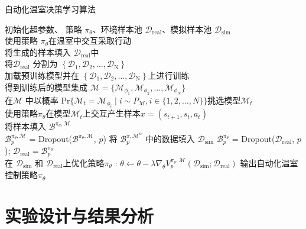 \begin{algorithm}[ht]
\caption{自动化温室决策学习算法}
\begin{algorithmic}
\STATE 初始化超参数、 策略 $\pi_\theta$、环境样本池 $\mathcal{D}_{\mathrm{real}}$、模拟样本池 $\mathcal{D}_{\mathrm{sim}}$\\
    \STATE 使用策略 $\pi_\theta$在温室中交互采取行动\\
    \STATE 将生成的样本填入 $\mathcal{D}_{\mathrm{real}}$中\\
    \STATE 将$\mathcal{D}_{\mathrm{real}}$ 分割为 $\left\{\mathcal{D}_{\mathrm{1}}, \mathcal{D}_{\mathrm{2}}, \ldots, \mathcal{D}_{\mathrm{N}}\right\}$\\
        \STATE 加载预训练模型并在 $\left\{\mathcal{D}_{\mathrm{1}}, \mathcal{D}_{\mathrm{2}}, \ldots, \mathcal{D}_{\mathrm{N}}\right\}$上进行训练\\
        \STATE 得到训练后的模型集成 $\mathcal{M} = \{\mathcal{M}_{\phi_1},\mathcal{M}_{\phi_2},\ldots,\mathcal{M}_{\phi_{N}}\}$\\
            \STATE 在$\mathcal{M}$ 中以概率 $\mathrm{Pr}\{\mathcal{M}_t=\mathcal{M}_{\phi_i}\mid i\sim P_{\mathcal{M}}, i\in\{1,2,\ldots,N\}\}$挑选模型$\mathcal{M}_t$\\
            \STATE 使用策略$\pi_\theta$在模型$\mathcal{M}_t$上交互产生样本$x=\left(s_{t+1},s_t,a_t\right)$ \\
            \STATE 将样本填入 $\mathcal{B}^{\pi_\theta,\mathcal{M}}$\\
        \ENDFOR
        \STATE $\mathcal{B}^{\pi_\theta,\mathcal{M}}_p$ = Dropout($\mathcal{B}^{\pi_\theta,\mathcal{M}}$, $p$)
        \STATE 将 $\mathcal{B}^{\pi,\mathcal{M}^\alpha}_p$ 中的数据填入 $\mathcal{D}_\mathrm{sim}$
    \ENDFOR
    \STATE $\mathcal{B}^{\pi_\theta}_p$ = Dropout($\mathcal{D}_{\mathrm{real}}$, $p$); $\mathcal{D}_{\mathrm{real}} = \mathcal{B}^{\pi_\theta}_p$\\
    \STATE 在 $\mathcal{D}_{\mathrm{sim}}$ 和 $\mathcal{D}_{\mathrm{real}}$上优化策略$\pi_\theta$ : $\theta\leftarrow \theta - \lambda\nabla_\theta V^{{\pi_\theta},\mathcal{M}}_p(\mathcal{D}_{\mathrm{sim}}; \mathcal{D}_{\mathrm{real}})$
\ENDFOR
\STATE 输出自动化温室控制策略$\pi_\theta$
\end{algorithmic}\label{algo:acml-method}
\end{algorithm}

\section{实验设计与结果分析}

